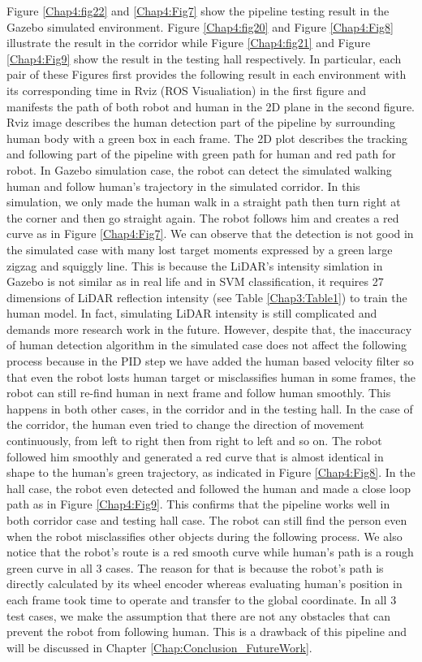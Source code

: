 Figure \ref{Chap4:fig22} and \ref{Chap4:Fig7} show the pipeline testing result in 
the Gazebo simulated environment. Figure \ref{Chap4:fig20} and Figure 
\ref{Chap4:Fig8} illustrate the result in the corridor while Figure \ref{Chap4:fig21} and Figure \ref{Chap4:Fig9} show the result 
in the testing hall respectively. In particular, each pair of these Figures first provides the following result in each environment with its corresponding time in Rviz (ROS Visualiation) in the first figure 
and manifests the path of both robot and human in the 2D plane in the second figure. Rviz image describes the human detection part of the pipeline by surrounding human body 
with a green box in each frame. The 2D plot describes the tracking and following part of the pipeline with green path for human and red path for robot.
In Gazebo simulation case, the robot can detect the simulated walking human and follow human's trajectory in the simulated corridor. In this simulation, we only made the human 
walk in a straight path then turn right at the corner and then go straight again. The robot follows him and creates a red curve as in Figure \ref{Chap4:Fig7}. We can observe that
the detection is not good in the simulated case with many lost target moments expressed by a green large zigzag and squiggly line. This is because the LiDAR's intensity simlation in Gazebo is not similar as in 
real life and in SVM classification, it requires 27 dimensions of LiDAR reflection intensity (see Table \ref{Chap3:Table1}) to train the human model. In fact, simulating LiDAR intensity is still complicated and demands more research work in the future.
However, despite that, the inaccuracy of human detection algorithm in the simulated case does not affect the following process because in the PID step we have added the human based velocity filter so that even the robot losts human target or misclassifies human in 
some frames, the robot can still re-find human in next frame and follow human smoothly. This happens in both other cases, in the corridor and in the testing hall. In the 
case of the corridor, the human even tried to change the direction of movement continuously, from left to right then from right to left and so on. The robot followed him smoothly and 
generated a red curve that is almost identical in shape to the human's green trajectory, as indicated in Figure \ref{Chap4:Fig8}. 
In the hall case, the robot even detected and followed the human and made a close loop path as in Figure \ref{Chap4:Fig9}. This confirms that the pipeline works well in both corridor case and testing hall case. 
The robot can still find the person even when the robot misclassifies other objects during the following process. We also notice that the robot's route is a red smooth curve while human's path is a rough green curve in all 3 cases. 
The reason for that is because the robot's path is directly calculated by its wheel encoder whereas evaluating human's position in each frame took time to operate and transfer to the global coordinate. In all 3 test cases, we make the assumption that 
there are not any obstacles that can prevent the robot from following human. This is a drawback of this pipeline and will be discussed in Chapter \ref{Chap:Conclusion_FutureWork}.